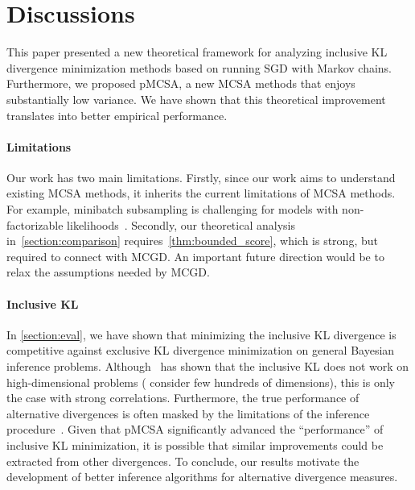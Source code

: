 
\vspace{-0.15in}
\section{Discussions}\label{section:discussion}
\vspace{-0.1in}
This paper presented a new theoretical framework for analyzing inclusive KL divergence minimization methods based on running SGD with Markov chains.
Furthermore, we proposed pMCSA, a new MCSA methods that enjoys substantially low variance.
We have shown that this theoretical improvement translates into better empirical performance.

\vspace{-0.1in}
\paragraph{Limitations}
Our work has two main limitations.
Firstly, since our work aims to understand existing MCSA methods, it inherits the current limitations of MCSA methods.
For example, minibatch subsampling is challenging for models with non-factorizable likelihoods~\citep{NEURIPS2020_b2070693}.
Secondly, our theoretical analysis in~\cref{section:comparison} requires~\cref{thm:bounded_score}, which is strong, but required to connect with MCGD.
An important future direction would be to relax the assumptions needed by MCGD.

\vspace{-0.1in}
\paragraph{Inclusive KL}
In \cref{section:eval}, we have shown that minimizing the inclusive KL divergence is competitive against exclusive KL divergence minimization on general Bayesian inference problems.
Although~\citet{dhaka_challenges_2021} has shown that the inclusive KL does not work on high-dimensional problems (\citeauthor{dhaka_challenges_2021} consider few hundreds of dimensions), this is only the case with strong correlations.
Furthermore, the true performance of alternative divergences is often masked by the limitations of the inference procedure~\citet{geffner2021empirical, pmlr-v139-geffner21a}.
Given that pMCSA significantly advanced the ``performance'' of inclusive KL minimization, it is possible that similar improvements could be extracted from other divergences.
To conclude, our results motivate the development of better inference algorithms for alternative divergence measures.


